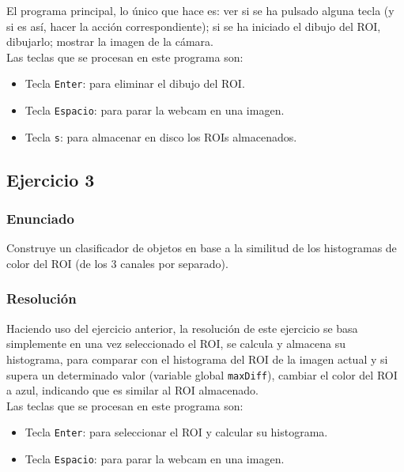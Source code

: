 \documentclass[a4paper,10pt,titlepage,oneside,openright]{book}
\begin{document}
El programa principal, lo único que hace es: ver si se ha pulsado alguna tecla (y si es así, hacer la acción correspondiente); si se ha iniciado el dibujo del ROI, dibujarlo; mostrar la imagen de la cámara. \\

Las teclas que se procesan en este programa son:
\begin{itemize}
 \item Tecla \texttt{Enter}: para eliminar el dibujo del ROI.
 \item Tecla \texttt{Espacio}: para parar la webcam en una imagen.
 \item Tecla \texttt{s}: para almacenar en disco los ROIs almacenados.
\end{itemize}



\medskip
\subsection{Ejercicio 3}

\subsubsection*{Enunciado}
Construye un clasificador de objetos en base a la similitud de los histogramas de color del ROI (de los 3 canales por separado).

\subsubsection*{Resolución}
Haciendo uso del ejercicio anterior, la resolución de este ejercicio se basa simplemente en una vez seleccionado el ROI, se calcula y almacena su histograma, para comparar con el histograma del ROI de la imagen actual y si supera un determinado valor (variable global \texttt{maxDiff}), cambiar el color del ROI a azul, indicando que es similar al ROI almacenado. \\

Las teclas que se procesan en este programa son:
\begin{itemize}
 \item Tecla \texttt{Enter}: para seleccionar el ROI y calcular su histograma.
 \item Tecla \texttt{Espacio}: para parar la webcam en una imagen.
\end{itemize}
\end{document}
